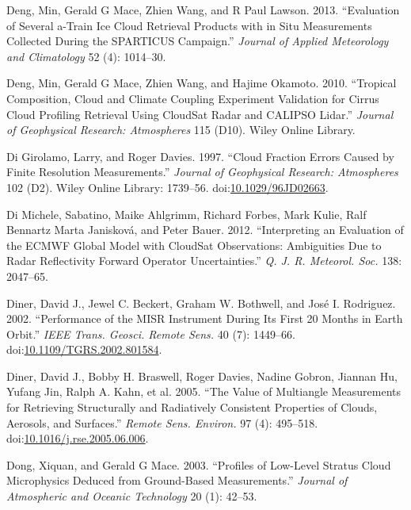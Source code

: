 \hypertarget{ref-dengux5fetux5falux5f2013}{}
Deng, Min, Gerald G Mace, Zhien Wang, and R Paul Lawson. 2013.
``Evaluation of Several a-Train Ice Cloud Retrieval Products with in
Situ Measurements Collected During the SPARTICUS Campaign.''
\emph{Journal of Applied Meteorology and Climatology} 52 (4): 1014--30.

\hypertarget{ref-dengux5fetux5falux5f2010}{}
Deng, Min, Gerald G Mace, Zhien Wang, and Hajime Okamoto. 2010.
``Tropical Composition, Cloud and Climate Coupling Experiment Validation
for Cirrus Cloud Profiling Retrieval Using CloudSat Radar and CALIPSO
Lidar.'' \emph{Journal of Geophysical Research: Atmospheres} 115 (D10).
Wiley Online Library.

\hypertarget{ref-digirolamoux5fandux5fdaviesux5f1997}{}
Di Girolamo, Larry, and Roger Davies. 1997. ``Cloud Fraction Errors
Caused by Finite Resolution Measurements.'' \emph{Journal of Geophysical
Research: Atmospheres} 102 (D2). Wiley Online Library: 1739--56.
doi:\href{https://doi.org/10.1029/96JD02663}{10.1029/96JD02663}.

\hypertarget{ref-dimicheleux5fetux5falux5f2012}{}
Di Michele, Sabatino, Maike Ahlgrimm, Richard Forbes, Mark Kulie, Ralf
Bennartz Marta Janisková, and Peter Bauer. 2012. ``Interpreting an
Evaluation of the ECMWF Global Model with CloudSat Observations:
Ambiguities Due to Radar Reflectivity Forward Operator Uncertainties.''
\emph{Q. J. R. Meteorol. Soc.} 138: 2047--65.

\hypertarget{ref-dinerux5fetux5falux5f2002}{}
Diner, David J., Jewel C. Beckert, Graham W. Bothwell, and José I.
Rodriguez. 2002. ``Performance of the MISR Instrument During Its First
20 Months in Earth Orbit.'' \emph{IEEE Trans. Geosci. Remote Sens.} 40
(7): 1449--66.
doi:\href{https://doi.org/10.1109/TGRS.2002.801584}{10.1109/TGRS.2002.801584}.

\hypertarget{ref-dinerux5fetux5falux5f2005}{}
Diner, David J., Bobby H. Braswell, Roger Davies, Nadine Gobron, Jiannan
Hu, Yufang Jin, Ralph A. Kahn, et al. 2005. ``The Value of Multiangle
Measurements for Retrieving Structurally and Radiatively Consistent
Properties of Clouds, Aerosols, and Surfaces.'' \emph{Remote Sens.
Environ.} 97 (4): 495--518.
doi:\href{https://doi.org/10.1016/j.rse.2005.06.006}{10.1016/j.rse.2005.06.006}.

\hypertarget{ref-dongux5fandux5fmaceux5f2003}{}
Dong, Xiquan, and Gerald G Mace. 2003. ``Profiles of Low-Level Stratus
Cloud Microphysics Deduced from Ground-Based Measurements.''
\emph{Journal of Atmospheric and Oceanic Technology} 20 (1): 42--53.

